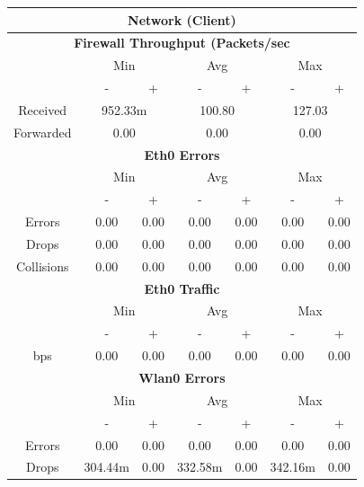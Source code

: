 \documentclass[11pt,a4paper]{scrreprt}
\begin{document}
\begin{table}[H]
\centering
    \begin{tabular}{||c|c|c|c|c|c|c||}
    \hline
    \multicolumn{7}{|c|}{\textbf{Network (Client)}} \\
    \hline
    \multicolumn{7}{|c|}{\textbf{Firewall Throughput (Packets/sec}} \\
    \hline\hline
      & \multicolumn{2}{|c|}{Min} & \multicolumn{2}{|c|}{Avg} & \multicolumn{2}{|c|}{Max} \\
    \hline\hline
      & - & + & - & + & - & + \\
    \hline
    Received & \multicolumn{2}{|c|}{952.33m} & \multicolumn{2}{|c|}{100.80} & \multicolumn{2}{|c|}{127.03} \\
    \hline
    Forwarded & \multicolumn{2}{|c|}{0.00} & \multicolumn{2}{|c|}{0.00} & \multicolumn{2}{|c|}{0.00} \\
    \hline\hline
    \multicolumn{7}{|c|}{\textbf{Eth0 Errors}} \\
    \hline\hline
      & \multicolumn{2}{|c|}{Min} & \multicolumn{2}{|c|}{Avg} & \multicolumn{2}{|c|}{Max} \\
    \hline
     & - & + & - & + & - & + \\
    \hline
    Errors & 0.00 & 0.00 & 0.00 & 0.00 & 0.00 & 0.00 \\
    \hline
    Drops & 0.00 & 0.00 & 0.00 & 0.00 & 0.00 & 0.00 \\
    \hline
    Collisions & 0.00 & 0.00 & 0.00 & 0.00 & 0.00 & 0.00 \\
    \hline\hline
    \multicolumn{7}{|c|}{\textbf{Eth0 Traffic}} \\
    \hline\hline
      & \multicolumn{2}{|c|}{Min} & \multicolumn{2}{|c|}{Avg} & \multicolumn{2}{|c|}{Max} \\
    \hline
      & - & + & - & + & - & + \\
    \hline
    bps & 0.00 & 0.00 & 0.00 & 0.00 & 0.00 & 0.00 \\
    \hline\hline
    \multicolumn{7}{|c|}{\textbf{Wlan0 Errors}} \\
    \hline\hline
      & \multicolumn{2}{|c|}{Min} & \multicolumn{2}{|c|}{Avg} & \multicolumn{2}{|c|}{Max} \\
    \hline
      & - & + & - & + & - & + \\
    \hline
    Errors  & 0.00 & 0.00 & 0.00 & 0.00 & 0.00 & 0.00 \\
    \hline
    Drops & 304.44m & 0.00 & 332.58m & 0.00 & 342.16m & 0.00 \\

\end{tabular}
\end{table}
\end{document}
